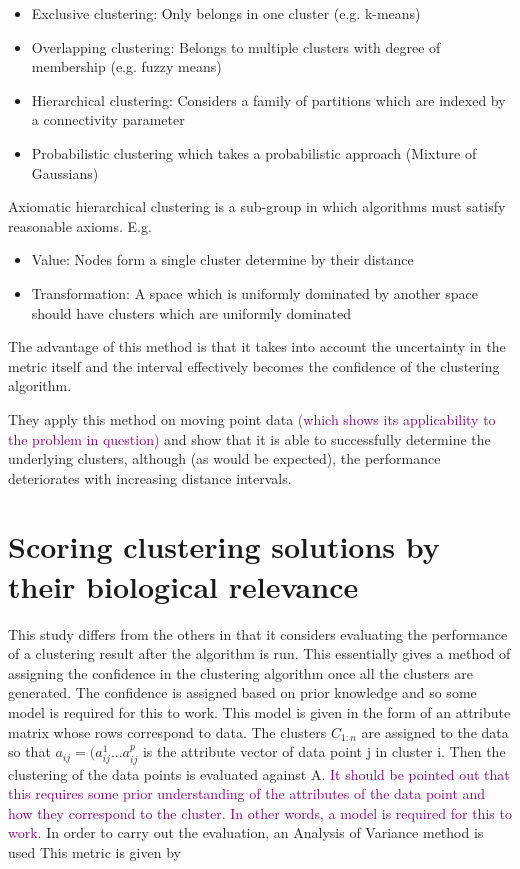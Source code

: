 \documentclass{report}
\newcommand\NOTE[1]{\textcolor{purple}{#1}}
\begin{document}
    \begin{itemize}
        \item Exclusive clustering: Only belongs in one cluster (e.g. k-means)
        \item Overlapping clustering: Belongs to multiple clusters with degree of membership (e.g. fuzzy means)
        \item Hierarchical clustering: Considers a family of partitions which are indexed by a connectivity parameter
        \item Probabilistic clustering which takes a probabilistic approach (Mixture of Gaussians)
    \end{itemize}

    Axiomatic hierarchical clustering is a sub-group in which algorithms must satisfy reasonable axioms. E.g.

    \begin{itemize}
        \item Value: Nodes form a single cluster determine by their distance
        \item Transformation: A space which is uniformly dominated by another space should have clusters which are uniformly dominated
    \end{itemize}

    The advantage of this method is that it takes into account the uncertainty in the metric itself and the interval effectively becomes the confidence of the clustering algorithm. 

    They apply this method on moving point data \NOTE{(which shows its applicability to the problem in question)} and show that it is able to successfully determine the underlying clusters, although (as would be expected), the performance deteriorates with increasing distance intervals.

    \section{Scoring clustering solutions by their biological relevance}

    This study differs from the others in that it considers evaluating the performance of a clustering result after the algorithm is run. This essentially gives a method of assigning the confidence in the clustering algorithm once all the clusters are generated. The confidence is assigned based on prior knowledge and so some model is required for this to work. This model is given in the form of an attribute matrix whose rows correspond to data. The clusters $C_{1:n}$ are assigned to the data so that $a_{ij} = (a_{ij}^1 ...a_{ij}^p$ is the attribute vector of data point j in cluster i. Then the clustering of the data points is evaluated against A. \NOTE{It should be pointed out that this requires some prior understanding of the attributes of the data point and how they correspond to the cluster. In other words, a model is required for this to work.} In order to carry out the evaluation, an Analysis of Variance method is used This metric is given by
\end{document}
